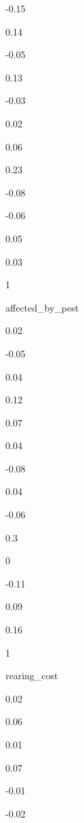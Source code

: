 \documentclass[
]{article}
\begin{document}
{-0.15}

{0.14 }

{-0.05}

{0.13 }

{-0.03}

{0.02 }

{0.06 }

{0.23 }

{-0.08}

{-0.06}

{0.05 }

{0.03 }

{1 }

{ }

{ }

{ }

{ }

{ }

{ }

{ }

{ }

{ }

{ }

affected\_by\_pest

{0.02 }

{-0.05}

{0.04 }

{0.12 }

{0.07 }

{0.04 }

{-0.08}

{0.04 }

{-0.06}

{0.3 }

{0 }

{-0.11}

{0.09 }

{0.16 }

{1 }

{ }

{ }

{ }

{ }

{ }

{ }

{ }

{ }

{ }

rearing\_cost

{0.02 }

{0.06 }

{0.01 }

{0.07 }

{-0.01}

{-0.02}
\end{document}
